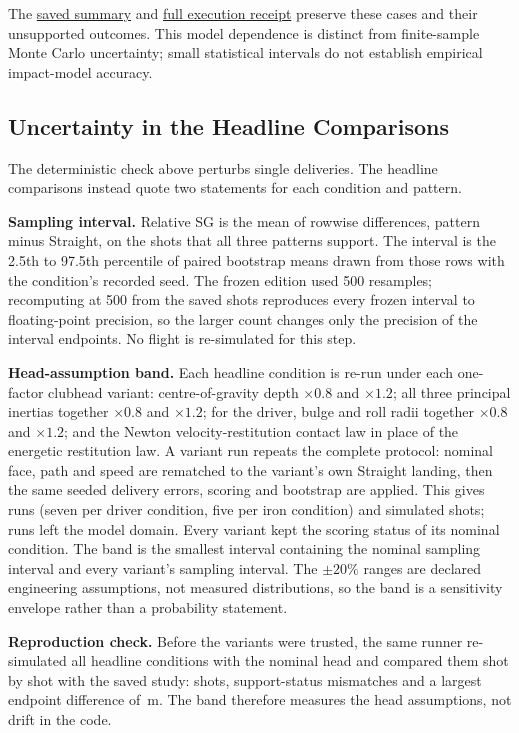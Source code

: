 \documentclass[11pt,letterpaper]{article}
\begin{document}
The \href{phase2/validation/independent_head_sensitivity_summary.json}{saved
summary} and \href{phase2/validation/independent_head_sensitivity.json}{full
execution receipt} preserve these cases and their unsupported outcomes.
This model dependence is distinct from finite-sample Monte Carlo uncertainty;
small statistical intervals do not establish empirical impact-model accuracy.

\subsection{Uncertainty in the Headline Comparisons}
\label{sec:head-band}
The deterministic check above perturbs single deliveries. The headline
comparisons instead quote two statements for each condition and pattern.

\textbf{Sampling interval.} Relative SG is the mean of rowwise differences,
pattern minus Straight, on the shots that all three patterns support. The
interval is the 2.5th to 97.5th percentile of \BootstrapResamples{} paired
bootstrap means drawn from those rows with the condition's recorded seed. The
frozen edition used 500 resamples; recomputing at 500 from the saved shots
reproduces every frozen interval to floating-point precision, so the larger
count changes only the
precision of the interval endpoints. No flight is re-simulated for this step.

\textbf{Head-assumption band.} Each headline condition is re-run under each
one-factor clubhead variant: centre-of-gravity depth $\times0.8$ and
$\times1.2$; all three principal inertias together $\times0.8$ and
$\times1.2$; for the driver, bulge and roll radii together $\times0.8$ and
$\times1.2$; and the Newton velocity-restitution contact law in place of the
energetic restitution law. A variant run repeats the complete protocol:
nominal face, path and speed are rematched to the variant's own Straight
landing, then the same seeded delivery errors, scoring and bootstrap are
applied. This gives \BandVariantRuns{} runs (seven per driver condition, five
per iron condition) and \BandShots{} simulated shots; \BandUnavailableRuns{}
runs left the model domain. Every variant kept the scoring status of its
nominal condition. The band is the smallest interval containing the nominal
sampling interval and every variant's sampling interval. The $\pm20\%$ ranges
are declared engineering assumptions, not measured distributions, so the band
is a sensitivity envelope rather than a probability statement.

\textbf{Reproduction check.} Before the variants were trusted, the same
runner re-simulated all \ReproCells{} headline conditions with the nominal
head and compared them shot by shot with the saved study:
\ReproShots{} shots, \ReproStatusMismatches{} support-status mismatches and
a largest endpoint difference of \ReproMaxEndpointDifference{}\,m. The band
therefore measures the head assumptions, not drift in the code.
\end{document}
